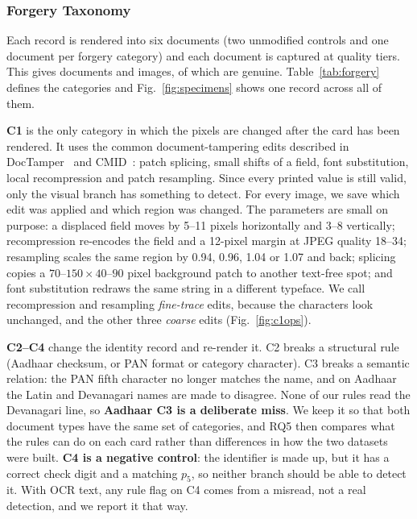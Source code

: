 \documentclass[12pt]{article}
\begin{document}
\subsubsection{Forgery Taxonomy}
\label{subsec:taxonomy}

Each record is rendered into six documents (two unmodified controls and
one document per forgery category) and each document is captured at
\dsNq{} quality tiers. This gives \dsDocuments{} documents and
\dsImages{} images, of which \dsGenuine{} are genuine.
Table~\ref{tab:forgery} defines the categories and
Fig.~\ref{fig:specimens} shows one record across all of them.



\textbf{C1} is the only category in which the pixels are changed after the card has been rendered. It uses the common document-tampering edits described in DocTamper~\cite{doctamper} and CMID~\cite{cmid}: patch splicing, small shifts of a field, font substitution, local recompression and patch resampling. Since every printed value is still valid, only the visual branch has something to detect. For every image, we save which edit was applied and which region was changed. The parameters are small on purpose: a
displaced field moves by 5--11 pixels horizontally and 3--8 vertically;
recompression re-encodes the field and a 12-pixel margin at JPEG
quality 18--34; resampling scales the same region by 0.94, 0.96, 1.04
or 1.07 and back; splicing copies a $70$--$150\times40$--$90$ pixel
background patch to another text-free spot; and font substitution
redraws the same string in a different typeface. We call recompression
and resampling \emph{fine-trace} edits, because the characters look
unchanged, and the other three \emph{coarse} edits
(Fig.~\ref{fig:c1ops}).


\textbf{C2--C4} change the identity record and re-render it. C2 breaks a
structural rule (Aadhaar checksum, or PAN format or category character).
C3 breaks a semantic relation: the PAN fifth character no longer
matches the name, and on Aadhaar the Latin and Devanagari names are made
to disagree. None of our rules read the Devanagari line, so \textbf{Aadhaar C3 is a deliberate miss}. We keep it so that both document types have the same set of categories, and RQ5 then compares what the rules can do on each card rather than differences in how the two datasets were built. \textbf{C4 is a negative control}: the identifier is made up, but it has a correct check digit and a matching $p_5$, so neither branch should be able to detect it. With OCR text, any rule flag on C4 comes from a misread, not a real detection, and we report it that way.
\end{document}
